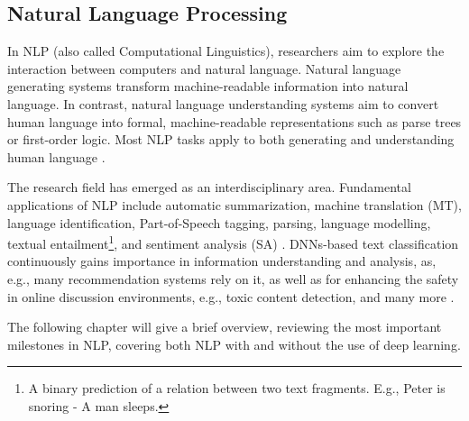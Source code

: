 
\subsection{Natural Language Processing}
\label{sec:natural_language_processing}

In NLP (also called Computational Linguistics), researchers aim to explore the interaction between computers and natural language. Natural language generating systems transform machine-readable information into natural language. In contrast, natural language understanding systems aim to convert human language into formal, machine-readable representations such as parse trees or first-order logic. Most NLP tasks apply to both generating and understanding human language \cite{kumar2011natural}.

The research field has emerged as an interdisciplinary area. Fundamental applications of NLP include automatic summarization, machine translation (MT), language identification, Part-of-Speech tagging, parsing, language modelling, textual entailment\footnote{A binary prediction of a relation between two text fragments. E.g., Peter is snoring - A man sleeps.}, and sentiment analysis (SA) \cite{mani2001automatic, dostert1955georgetown, tang2017phonetic, schmid1994part, bengio2003neural, socher2013recursive,dagan2005pascal, prabowo2009sentiment}. DNNs-based text classification continuously gains importance in information understanding and analysis, as, e.g., many recommendation systems rely on it, as well as for enhancing the safety in online discussion environments, e.g., toxic content detection, and many more \cite{kumar2011natural}. 



The following chapter will give a brief overview, reviewing the most important milestones in NLP, covering both NLP with and without the use of deep learning.

